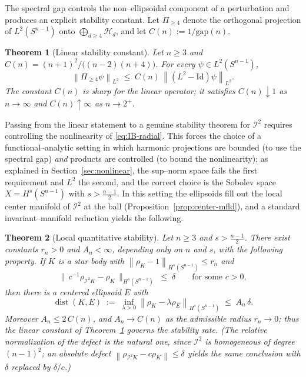 \documentclass[10pt,a4paper]{amsart}
\newtheorem{theorem}{Theorem}[section]
\newcommand{\Sph}{S^{n-1}}
\newcommand{\IB}{\mathcal{I}}
\newcommand{\Hd}[1]{\mathcal{H}_{#1}}
\newcommand{\norm}[1]{\left\lVert #1 \right\rVert}
\DeclareMathOperator{\dist}{dist}
\begin{document}
The spectral gap controls the non--ellipsoidal component of a perturbation and
produces an explicit stability constant. Let $\Pi_{\ge 4}$ denote the
orthogonal projection of $L^2(\Sph)$ onto $\bigoplus_{d\ge 4}\Hd d$, and let
$C(n) := 1/\mathrm{gap}(n)$.

\begin{theorem}[Linear stability constant]\label{thm:linear-stab}
Let $n\ge 3$ and $C(n)=(n+1)^2/\big((n-2)(n+4)\big)$. For every
$\psi\in L^2(\Sph)$,
\[
   \norm{\Pi_{\ge 4}\psi}_{L^2}\;\le\; C(n)\,\norm{(L^2-\mathrm{Id})\psi}_{L^2}.
\]
The constant $C(n)$ is sharp for the linear operator; it satisfies
$C(n)\downarrow 1$ as $n\to\infty$ and $C(n)\uparrow\infty$ as $n\to 2^+$.
\end{theorem}

Passing from the linear statement to a genuine stability theorem for $\IB^2$
requires controlling the nonlinearity of \eqref{eq:IB-radial}. This forces the
choice of a functional--analytic setting in which harmonic projections are
bounded (to use the spectral gap) \emph{and} products are controlled (to bound
the nonlinearity); as explained in Section~\ref{sec:nonlinear}, the sup--norm
space fails the first requirement and $L^2$ the second, and the correct choice
is the Sobolev space $X=H^s(\Sph)$ with $s>\tfrac{n-1}{2}$. In this setting the
ellipsoids fill out the local center manifold of $\IB^2$ at the ball
(Proposition~\ref{prop:center-mfld}), and a standard invariant--manifold
reduction yields the following.

\begin{theorem}[Local quantitative stability]\label{thm:nonlinear}
Let $n\ge 3$ and $s>\tfrac{n-1}{2}$. There exist constants $r_n>0$ and
$A_n<\infty$, depending only on $n$ and $s$, with the following property. If $K$
is a star body with $\norm{\rho_K-1}_{H^s(\Sph)}\le r_n$ and
\[
   \Big\|\,c^{-1}\rho_{\IB^2 K}-\rho_K\,\Big\|_{H^s(\Sph)}\;\le\;\delta
   \qquad\text{for some } c>0,
\]
then there is a centered ellipsoid $E$ with
\[
   \dist(K,E)\;:=\;\inf_{\lambda>0}\norm{\rho_K-\lambda\rho_E}_{H^s(\Sph)}
   \;\le\; A_n\,\delta .
\]
Moreover $A_n\le 2\,C(n)$, and $A_n\to C(n)$ as the admissible radius
$r_n\to0$; thus the linear constant of Theorem~\ref{thm:linear-stab} governs
the stability rate. (The relative normalization of the defect is the natural
one, since $\IB^2$ is homogeneous of degree $(n-1)^2$; an absolute defect
$\norm{\rho_{\IB^2K}-c\rho_K}\le\delta$ yields the same conclusion with
$\delta$ replaced by $\delta/c$.)
\end{theorem}
\end{document}
